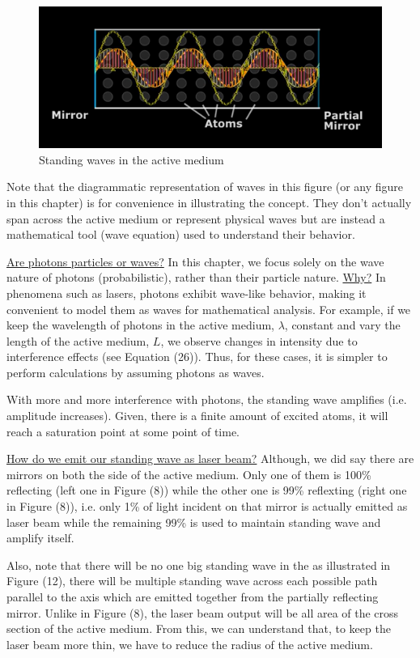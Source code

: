 \documentclass[12pt]{article}
\begin{document}
\begin{figure}[H]
    \centering
    \includegraphics[scale=.8]{./img/14_standing_waves.png}
    \caption{Standing waves in the active medium}
\end{figure}

Note that the diagrammatic representation of waves in this figure (or any figure in this chapter) is for convenience in illustrating the concept. They don't actually span across the active medium or represent physical waves but are instead a mathematical tool (wave equation) used to understand their behavior. \vspace{.2cm}

\uline{Are photons particles or waves?} In this chapter, we focus solely on the wave nature of photons (probabilistic), rather than their particle nature. \uline{Why?} In phenomena such as lasers, photons exhibit wave-like behavior, making it convenient to model them as waves for mathematical analysis. For example, if we keep the wavelength of photons in the active medium, \(\lambda\), constant and vary the length of the active medium, \(L\), we observe changes in intensity due to interference effects (see Equation (26)). Thus, for these cases, it is simpler to perform calculations by assuming photons as waves.
\vspace{.2cm}

With more and more interference with photons, the standing wave amplifies (i.e. amplitude increases). Given, there is a finite amount of excited atoms, it will reach a saturation point at some point of time. \vspace{.2cm}

\uline{How do we emit our standing wave as laser beam?} Although, we did say there are mirrors on both the side of the active medium. Only one of them is 100\% reflecting (left one in Figure (8)) while the other one is 99\% reflexting (right one in Figure (8)), i.e. only 1\% of light incident on that mirror is actually emitted as laser beam while the remaining 99\% is used to maintain standing wave and amplify itself. \vspace{.2cm}

Also, note that there will be no one big standing wave in the  as illustrated in Figure (12), there will be multiple standing wave across each possible path parallel to the axis which are emitted together from the partially reflecting mirror. Unlike in Figure (8), the laser beam output will be all area of the cross section of the active medium. From this, we can understand that, to keep the laser beam more thin, we have to reduce the radius of the active medium.
\end{document}
